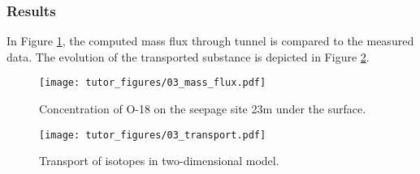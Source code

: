 \subsubsection{Results}

In Figure \ref{fig:conc_graph}, the computed mass flux through tunnel is
compared to the measured data. The evolution of the transported
substance is depicted in Figure \ref{fig:mass_real}.

\begin{figure}
\hypertarget{fig:conc_graph}{%
\centering
\texttt{[image: tutor\_figures/03\_mass\_flux.pdf]}
\caption{Concentration of O-18 on the seepage site 23m under the
surface.}\label{fig:conc_graph}
}
\end{figure}

\begin{figure}
\hypertarget{fig:mass_real}{%
\centering
\texttt{[image: tutor\_figures/03\_transport.pdf]}
\caption{Transport of isotopes in two-dimensional
model.}\label{fig:mass_real}
}
\end{figure}
